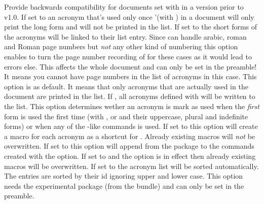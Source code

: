 \documentclass[DIV10,toc=index,toc=bib,hyperfootnotes=false]{cnpkgdoc}
\makeatletter
\newcommand*\sinceversion[1]{%
  \@bsphack
  \marginnote{%
    \footnotesize\sffamily\RaggedRight
    \textcolor{black!75}{Introduced in version~#1}}%
  \@esphack}
\makeatother
\begin{document}
\begin{beschreibung}
   Provide backwards compatibility for documents set with \acro in a version
   prior to v1.0.
   If set to  an acronym that's used only once '(with ) in a
   document will only print the long form and will not be printed in the list.
   If set to  the short forms of the acronyms will be linked to their
   list entry.
   Since \acro can handle arabic, roman and Roman page numbers but \emph{not}
   any other kind of numbering this option enables to turn the page number
   recording of for these cases as it would lead to errors else. This affects
   the whole document and can only be set in the preamble! It means you cannot
   have page numbers in the list of acronyms in this case.
   This option is  as default. It means that only acronyms that are
   actually used in the document are printed in the list. If , all
   acronyms defined with  will be written to the list.
   \sinceversion{1.2}%
   This option determines wether an acronym is mark as used when the \emph{first}
   form is used the first time (with ,  or  and
   their uppercase, plural and indefinite forms) or when any of the -like
   commands is used.   
   If set to  this option will create a macro  for each
   acronym as a shortcut for .  Already existing macros will
   \emph{not} be overwritten.
   \sinceversion{0.6}If set to  this option will append 
   from the  package to the commands created with the 
   option.
   If set to  and the option  is in effect then
   already existing macros will be overwritten.
   If set to  the acronym list will be sorted automatically. The
   entries are sorted by their \acs{id} ignoring upper and lower case. This
   option needs the experimental package  (from the
    bundle) and can only be set in the preamble.

\end{beschreibung}
\end{document}
